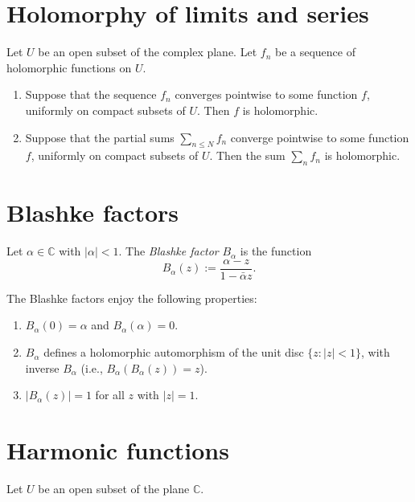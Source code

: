 \documentclass[reqno]{amsart} 
\begin{document}
\section{Holomorphy of limits and series}\label{sec:cj41z47df7}
\begin{theorem}\label{theorem:cj3vqa91ti}
  Let $U$ be an open subset of the complex plane.  Let $f_n$ be a sequence of holomorphic functions on $U$.
  \begin{enumerate}
  \item Suppose that the sequence $f_n$ converges pointwise to some function $f$, uniformly on compact subsets of $U$.  Then $f$ is holomorphic.
  \item Suppose that the partial sums $\sum_{n \leq N} f_n$ converge pointwise to some function $f$, uniformly on compact subsets of $U$.  Then the sum $\sum_n f_n$ is holomorphic.
  \end{enumerate}
\end{theorem}

\section{Blashke factors}\label{sec:cj41z47br7}
\begin{definition}\label{definition:cj41z47aw9}
  Let $\alpha \in \mathbb{C}$ with $\lvert \alpha  \rvert < 1$.  The \emph{Blashke factor} $B_\alpha$ is the function
  \begin{equation*}
B_\alpha(z) := \frac{\alpha - z }{ 1- \bar{\alpha } z}.
  \end{equation*}
\end{definition}
\begin{lemma}\label{lemma:cj41z469wv}
The Blashke factors enjoy the following properties:
\begin{enumerate}
\item $B_\alpha(0) = \alpha$ and $B_\alpha(\alpha) = 0$.
\item $B_\alpha$ defines a holomorphic automorphism of the unit disc $\{z : \lvert z \rvert < 1\}$, with inverse $B_\alpha$ (i.e., $B_\alpha(B_\alpha(z)) = z$).
\item $\lvert B_\alpha(z) \rvert = 1$ for all $z$ with $\lvert z \rvert = 1$.
\end{enumerate}
\end{lemma}

\section{Harmonic functions}\label{sec:cj41z468dg}
Let $U$ be an open subset of the plane $\mathbb{C}$.
\end{document}
